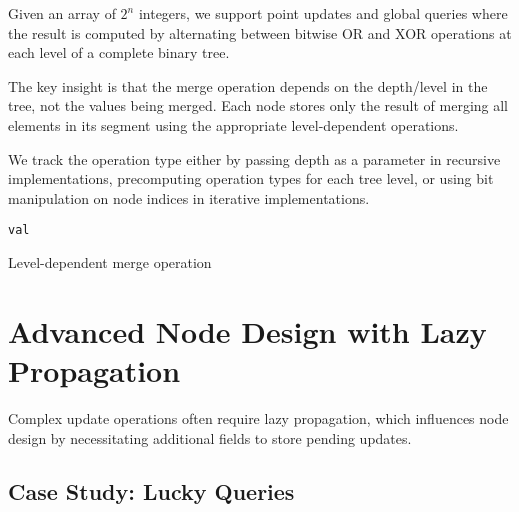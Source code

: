 

Given an array of $2^n$ integers, we support point updates and global queries where the result is computed by alternating between bitwise OR and XOR operations at each level of a complete binary tree.

The key insight is that the merge operation depends on the depth/level in the tree, not the values being merged. Each node stores only the result of merging all elements in its segment using the appropriate level-dependent operations.

We track the operation type either by passing depth as a parameter in recursive implementations, precomputing operation types for each tree level, or using bit manipulation on node indices in iterative implementations.

\begin{algorithm}[H]
\SetAlgoLined
{}
\BlankLine
{}
\Return \texttt{val}\;
\caption{Level-dependent merge operation}
\end{algorithm}

\section{Advanced Node Design with Lazy Propagation}

Complex update operations often require lazy propagation, which influences node design by necessitating additional fields to store pending updates.

\subsection{Case Study: Lucky Queries}


